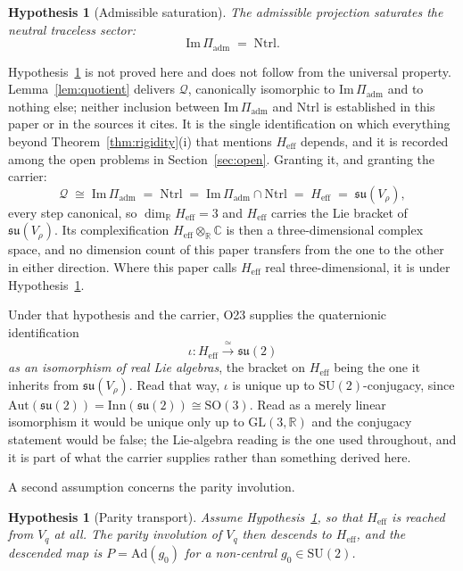 \documentclass[11pt,a4paper]{article}
\newtheorem{hypothesis}[theorem]{Hypothesis}
\theoremstyle{remark}
\begin{document}
  \begin{hypothesis}[Admissible saturation]
    \label{hyp:saturation}
    The admissible projection saturates the neutral traceless sector:
    \[
      \mathrm{Im}\,\Pi_{\mathrm{adm}} \;=\; \mathrm{Ntrl}.
    \]
  \end{hypothesis}

  Hypothesis~\ref{hyp:saturation} is not proved here and does not follow from the universal
  property.
  Lemma~\ref{lem:quotient} delivers $\mathcal{Q}$, canonically isomorphic to
  $\mathrm{Im}\,\Pi_{\mathrm{adm}}$ and to nothing else; neither inclusion between
  $\mathrm{Im}\,\Pi_{\mathrm{adm}}$ and $\mathrm{Ntrl}$ is established in this paper or in the
  sources it cites.
  It is the single identification on which everything beyond Theorem~\ref{thm:rigidity}(i) that
  mentions $H_{\mathrm{eff}}$ depends, and it is recorded among the open problems in
  Section~\ref{sec:open}.
  Granting it, and granting the carrier:
  \[
    \mathcal{Q} \;\cong\; \mathrm{Im}\,\Pi_{\mathrm{adm}} \;=\; \mathrm{Ntrl}
    \;=\; \mathrm{Im}\,\Pi_{\mathrm{adm}} \cap \mathrm{Ntrl} \;=\; H_{\mathrm{eff}}
    \;=\; \mathfrak{su}(V_\rho),
  \]
  every step canonical, so $\dim_{\mathbb{R}} H_{\mathrm{eff}} = 3$ and $H_{\mathrm{eff}}$ carries
  the Lie bracket of $\mathfrak{su}(V_\rho)$.
  Its complexification $H_{\mathrm{eff}} \otimes_{\mathbb{R}} \mathbb{C}$ is then a
  three-dimensional complex space, and no dimension count of this paper transfers from the one to
  the other in either direction.
  Where this paper calls $H_{\mathrm{eff}}$ real three-dimensional, it is under
  Hypothesis~\ref{hyp:saturation}.

  Under that hypothesis and the carrier, O23 supplies the quaternionic identification
  \[
    \iota \colon H_{\mathrm{eff}} \xrightarrow{\;\simeq\;} \mathfrak{su}(2)
  \]
  \emph{as an isomorphism of real Lie algebras}, the bracket on $H_{\mathrm{eff}}$ being the one it
  inherits from $\mathfrak{su}(V_\rho)$.
  Read that way, $\iota$ is unique up to $\mathrm{SU}(2)$-conjugacy, since
  $\mathrm{Aut}(\mathfrak{su}(2)) = \mathrm{Inn}(\mathfrak{su}(2)) \cong \mathrm{SO}(3)$.
  Read as a merely linear isomorphism it would be unique only up to $\mathrm{GL}(3,\mathbb{R})$ and
  the conjugacy statement would be false; the Lie-algebra reading is the one used throughout, and it
  is part of what the carrier supplies rather than something derived here.

  A second assumption concerns the parity involution.

  \begin{hypothesis}[Parity transport]
    \label{hyp:parity}
    Assume Hypothesis~\ref{hyp:saturation}, so that $H_{\mathrm{eff}}$ is reached from $V_q$ at all.
    The parity involution of $V_q$ then descends to $H_{\mathrm{eff}}$, and the descended map is
    $P = \mathrm{Ad}(g_0)$ for a non-central $g_0 \in \mathrm{SU}(2)$.
  \end{hypothesis}
\end{document}
